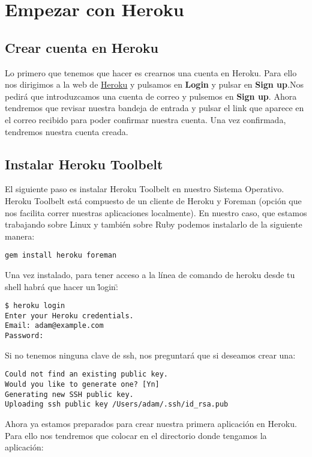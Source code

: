 

\section{Empezar con Heroku} %
\subsection{Crear cuenta en Heroku} 
Lo primero que tenemos que hacer es crearnos una cuenta en Heroku. Para ello nos dirigimos a la web de \href{www.heroku.com}{Heroku} y pulsamos 
en \textbf{Login} y pulsar en  \textbf{Sign up}.Nos pedirá que introduzcamos una cuenta de correo y pulsemos en \textbf{Sign up}. 
Ahora tendremos que revisar nuestra bandeja de entrada y pulsar el link que aparece en el correo recibido para poder confirmar nuestra cuenta.
Una vez confirmada, tendremos nuestra cuenta creada.

\subsection{Instalar Heroku Toolbelt}

El siguiente paso es instalar Heroku Toolbelt en nuestro Sistema Operativo. Heroku Toolbelt está compuesto de un cliente de Heroku y Foreman 
(opción que nos facilita correr nuestras aplicaciones localmente). En nuestro caso, que estamos trabajando sobre Linux y también sobre Ruby
podemos instalarlo de la siguiente manera:

\begin{verbatim}
gem install heroku foreman
\end{verbatim}

Una vez instalado, para tener acceso a la línea de comando de heroku desde tu shell habrá que hacer un \"login\":

\begin{verbatim}
$ heroku login
Enter your Heroku credentials.
Email: adam@example.com
Password:
\end{verbatim}

Si no tenemos ninguna clave de ssh, nos preguntará que si deseamos crear una:
\begin{verbatim}
Could not find an existing public key.
Would you like to generate one? [Yn]
Generating new SSH public key.
Uploading ssh public key /Users/adam/.ssh/id_rsa.pub
\end{verbatim}

Ahora ya estamos preparados para crear nuestra primera aplicación en Heroku.
Para ello nos tendremos que colocar en el directorio donde tengamos la aplicación: 

